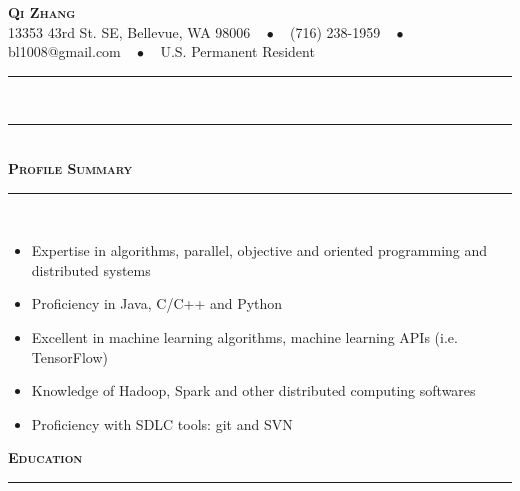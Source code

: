\documentclass[11pt]{article}
\begin{document}
\begin{center}
{\Huge\textbf{\textsc{{Qi Zhang}}}} \\[5pt]
13353 43rd St. SE, Bellevue, WA 98006 $\text{ }\bullet\text{ }$ (716) 238-1959 $\text{ }\bullet\text{ }$  bl1008@gmail.com $\text{ }\bullet\text{ }$ U.S. Permanent Resident 
\end{center}
 \rule[0.8em]{\textwidth}{0.5pt} \\[-11pt]
 \rule[0.8em]{\textwidth}{0.5pt} \\[0pt]
\textbf{\textsc{\LARGE{Profile Summary}}} \\ \rule[0.8em]{\textwidth}{0.5pt} \\[-20pt]
\begin{itemize}[topsep=0pt,partopsep=0pt,leftmargin=16pt]
\item Expertise in algorithms, parallel, objective and oriented programming and distributed systems
\item Proficiency in Java, C/C++ and Python 
\item Excellent in machine learning algorithms, machine learning APIs (i.e. TensorFlow)
\item Knowledge of Hadoop, Spark and other distributed computing softwares
\item Proficiency with SDLC tools: git and SVN
\end{itemize}
\vspace{4pt}

\textbf{\textsc{\LARGE{Education}}} \\ \rule[0.8em]{\textwidth}{0.5pt} \\[-16pt]
\end{document}
